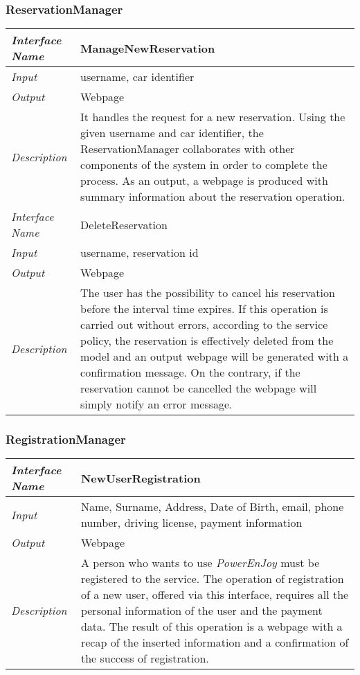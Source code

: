 \documentclass[11pt,a4paper]{report}
\begin{document}
\subsubsection{ReservationManager}
\begin{tabularx}{\textwidth}{|>{\em}l|X|}
	\hline
	Interface Name& ManageNewReservation\\
	\hline
	Input & username, car identifier\\
	\hline
	Output & Webpage\\
	\hline
	Description &It handles the request for a new reservation. Using the given username and car identifier, the ReservationManager collaborates with other components of the system in order to complete the process. As an output, a webpage is produced with summary information about the reservation operation.\\
	\hline \hline
	Interface Name& DeleteReservation\\
	\hline
	Input & username, reservation id\\
	\hline
	Output & Webpage\\
	\hline
	Description &The user has the possibility to cancel his reservation before the interval time expires. If this operation is carried out without errors, according to the service policy, the reservation is effectively deleted from the model and an output webpage will be generated with a confirmation message. On the contrary, if the reservation cannot be cancelled the webpage will simply notify an error message.\\
	\hline
\end{tabularx}
\subsubsection{RegistrationManager}
\begin{tabularx}{\textwidth}{|>{\em}l|X|}
	\hline
	Interface Name& NewUserRegistration\\
	\hline
	Input& Name, Surname, Address, Date of Birth, email, phone number, driving license, payment information\\
	\hline
	Output & Webpage\\
	\hline
	Description &A person who wants to use \textit{PowerEnJoy} must be registered to the service. The operation of registration of a new user, offered via this interface, requires all the personal information of the user and the payment data. The result of this operation is a webpage with a recap of the inserted information and a confirmation of the success of registration.\\
	\hline
\end{tabularx}
\end{document}
